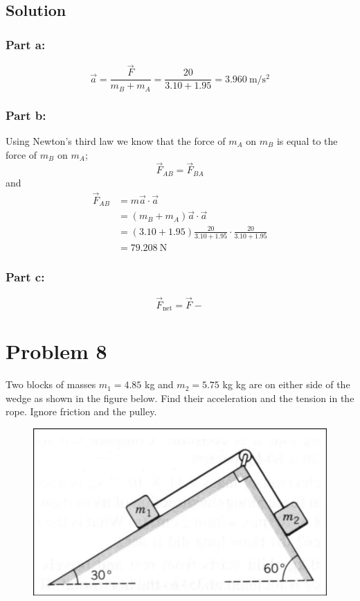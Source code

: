 \documentclass{article}
\begin{document}
\subsection*{Solution}
\subsubsection*{Part a:}
\[
	\vec{a} = \frac{\vec{F}}{m_B+m_A} = \frac{20}{3.10 + 1.95} = \boxed{3.960\ \text{m}/\text{s}^2}
\]

\subsubsection*{Part b:}
Using Newton's third law we know that the force of $m_A$ on $m_B$ is equal to the force of $m_B$ on $m_A$;
\[
	\vec{F}_{AB} = \vec{F}_{BA}
\]
and
\begin{align*}
	\vec{F}_{AB} &= m \vec{a} \cdot \vec{a} \\
	       &= \left( m_B + m_A \right)\vec{a} \cdot \vec{a} \\
	       &= \left( 3.10 + 1.95 \right)\frac{20}{3.10 + 1.95} \cdot \frac{20}{3.10 + 1.95} \\
	       &= \boxed{79.208\ \text{N}}
\end{align*}

\subsubsection*{Part c:}
\[
	\vec{F}_{\text{net}} = \vec{F} -
\]

\section*{Problem 8}
Two blocks of masses $m_1 = 4.85$ kg and $m_2 = 5.75$ kg kg are on either side of the wedge as shown in
the figure below. Find their acceleration and the tension in the rope. Ignore friction and the pulley.
\begin{figure}[ht]
    \centering
    \includegraphics[scale=.4]{drawing-6.png}
\end{figure}
\end{document}
